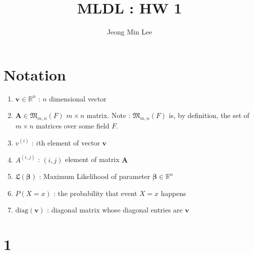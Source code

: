 \documentclass[10pt]{article}
\title{\textbf{MLDL : HW 1}}
\author{Jeong Min Lee}
\begin{document}
\maketitle
\section*{Notation}
\begin{enumerate}
    \item $\mathbf{v} \in \mathbb{R}^n$ : $n$ dimensional vector
    \item $\mathbf{A} \in \mathfrak{M}_{m,n}(F)$ $m\times n$ matrix. Note : $\mathfrak{M}_{m,n}(F)$ is, by definition, the set of $m \times n$ matrices over some field $F$.
    \item $v^{(i)}$ : $i$th element of vector $\mathbf{v}$
    \item $A^{(i,j)}$ : $(i,j)$ element of matrix $\mathbf{A}$
    \item $\mathfrak{L}(\boldsymbol{\beta})$ : Maximum Likelihood of parameter $\boldsymbol{\beta} \in \mathbb{R}^n$
    \item $P(X = x)$ : the probability that event $X = x$  happens
    \item $\text{diag}(\mathbf{v})$ : diagonal matrix whose diagonal entries are $\mathbf{v}$
\end{enumerate}

\section*{1}
\end{document}
